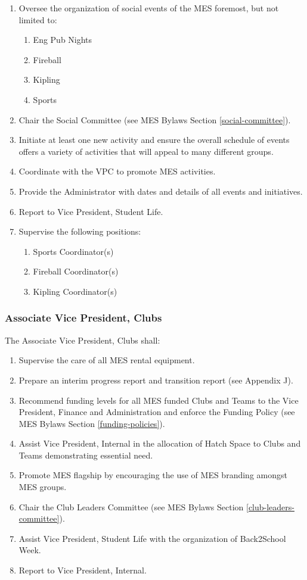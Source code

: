 \begin{enumerate}
\item
 Oversee the organization of social events of the MES foremost, but not
 limited to:

 \begin{enumerate}
  \item
   Eng Pub Nights
  \item
   Fireball
  \item
   Kipling
  \item
   Sports
 \end{enumerate}
\item
 Chair the Social Committee (see MES Bylaws Section \ref{social-committee}).
\item
 Initiate at least one new activity and ensure the overall schedule of
 events offers a variety of activities that will appeal to many
 different groups.
\item
 Coordinate with the VPC to promote MES activities.
\item
 Provide the Administrator with dates and details of all events and
 initiatives.
\item
 Report to Vice President, Student Life.
\item
 Supervise the following positions:

 \begin{enumerate}
  \item
   Sports Coordinator(s)
  \item
   Fireball Coordinator(s)
  \item
   Kipling Coordinator(s)
\end{enumerate}
\end{enumerate}

\subsubsection{Associate Vice President, Clubs}
\label{associate-vice-president-clubs}
The Associate Vice President, Clubs shall:

\begin{enumerate}
\item
 Supervise the care of all MES rental equipment.
\item
 Prepare an interim progress report and transition report (see Appendix
 J). %
\item
 Recommend funding levels for all MES funded Clubs and Teams to the
 Vice President, Finance and Administration and enforce the Funding
 Policy (see MES Bylaws Section \ref{funding-policies}).
\item
 Assist Vice President, Internal in the allocation of Hatch Space to
 Clubs and Teams demonstrating essential need.
\item
 Promote MES flagship by encouraging the use of MES branding amongst
 MES groups.
\item
 Chair the Club Leaders Committee (see MES Bylaws Section \ref{club-leaders-committee}).
\item
 Assist Vice President, Student Life with the organization of
 Back2School Week.
\item
 Report to Vice President, Internal.
\end{enumerate}

